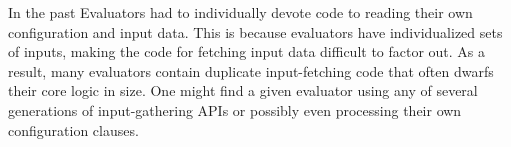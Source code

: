\documentclass{article}
\begin{document}
In the past Evaluators had to individually devote code to reading their own configuration and input data.  This is because evaluators have individualized sets of inputs, making the code for fetching input data difficult to factor out.  As a result, many evaluators contain duplicate input-fetching code that often dwarfs their core logic in size.  One might find a given evaluator using any of several generations of input-gathering APIs or possibly even processing their own configuration clauses.
\end{document}
